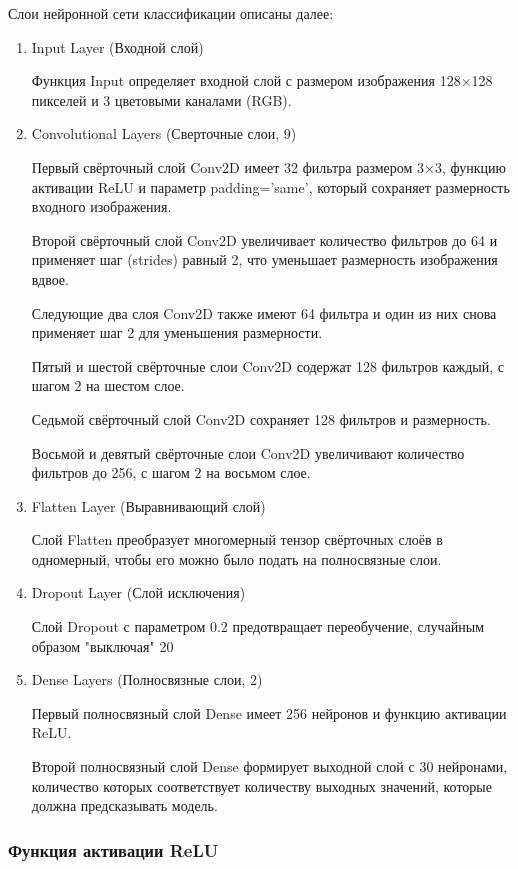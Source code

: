 Слои нейронной сети классификации описаны далее:

\begin{enumerate}
\item Input Layer (Входной слой)

Функция Input определяет входной слой с размером изображения 128×128 пикселей и 3 цветовыми каналами (RGB).
\item Convolutional Layers (Сверточные слои, 9)

Первый свёрточный слой Conv2D имеет 32 фильтра размером 3×3, функцию активации ReLU и параметр padding='same', который сохраняет размерность входного изображения.

Второй свёрточный слой Conv2D увеличивает количество фильтров до 64 и применяет шаг (strides) равный 2, что уменьшает размерность изображения вдвое.

Следующие два слоя Conv2D также имеют 64 фильтра и один из них снова применяет шаг 2 для уменьшения размерности.

Пятый и шестой свёрточные слои Conv2D содержат 128 фильтров каждый, с шагом 2 на шестом слое.

Седьмой свёрточный слой Conv2D сохраняет 128 фильтров и размерность.

Восьмой и девятый свёрточные слои Conv2D увеличивают количество фильтров до 256, с шагом 2 на восьмом слое.
\item Flatten Layer (Выравнивающий слой)

Слой Flatten преобразует многомерный тензор свёрточных слоёв в одномерный, чтобы его можно было подать на полносвязные слои.
\item Dropout Layer (Слой исключения)

Слой Dropout с параметром 0.2 предотвращает переобучение, случайным образом "выключая" 20%
\item Dense Layers (Полносвязные слои, 2)

Первый полносвязный слой Dense имеет 256 нейронов и функцию активации ReLU.

Второй полносвязный слой Dense формирует выходной слой с 30 нейронами, количество которых соответствует количеству выходных значений, которые должна предсказывать модель.
\end{enumerate}

\subsubsection{Функция активации ReLU}

